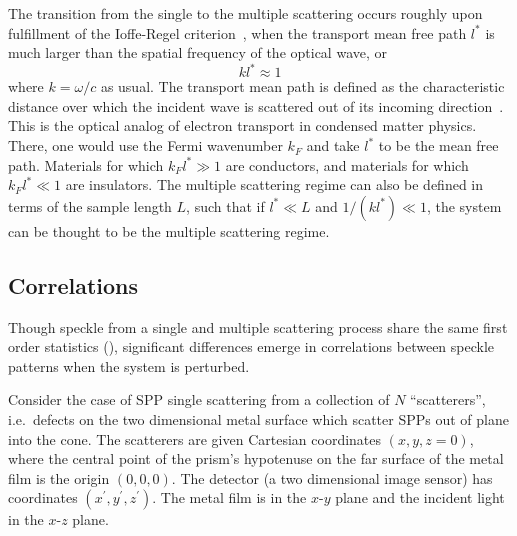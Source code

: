 The transition from the single to the multiple scattering occurs roughly upon
fulfillment of the Ioffe-Regel criterion~\cite{ioffe1960non}, when the
transport mean free path $l^*$ is much larger than the spatial frequency of
the optical wave, or
\begin{equation}
k l^* \approx 1
\end{equation}
where $k=\omega/c$ as usual.  The transport mean path is defined as the
characteristic distance over which the incident wave is scattered out of
its incoming direction~\cite{berkovits1994correlations}.  This is the
optical analog of electron transport in condensed matter physics.  There,
one would use the Fermi wavenumber $k_F$ and take $l^*$ to be the mean free
path.  Materials for which $k_F l^* \gg 1$ are conductors, and materials
for which $k_F l^* \ll 1$ are insulators.  The multiple scattering regime can
also be defined in terms of the sample length $L$, such that if
$l^* \ll L$ and $1/(k l^*) \ll 1$, the system can be thought to be the
multiple scattering regime.  

\subsection{Correlations}
Though speckle from a single and multiple scattering process share the same
first order statistics (), significant differences emerge
in correlations between speckle patterns when the system is perturbed.  

Consider the case of SPP single scattering from a collection of $N$
``scatterers'', i.e.\ defects on the two dimensional metal surface which
scatter SPPs out of plane into the cone.  The scatterers are given Cartesian
coordinates $(x,y,z=0)$, where the central point of the prism's hypotenuse on
the far surface of the metal film is the origin $(0,0,0)$.  The detector (a
two dimensional image sensor) has coordinates $(x^\prime,y^\prime,z^\prime)$.
The metal film is in the $x$-$y$ plane and the incident light in the $x$-$z$
plane.

